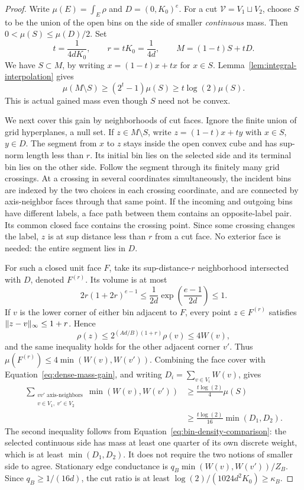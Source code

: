 \begin{proof}
Write $\mu(E)=\int_E\rho$ and $D=(0,K_0)^e$.  For a cut
$\mathcal V=V_1\sqcup V_2$, choose $S$ to be the union of the open bins
on the side of smaller \emph{continuous} mass.  Then
$0<\mu(S)\le\mu(D)/2$.  Set
\[
 t=\frac1{4dK_0},\qquad r=tK_0=\frac1{4d},\qquad
 M=(1-t)S+tD.
\]
We have $S\subset M$, by writing $x=(1-t)x+tx$ for $x\in S$.
Lemma~\ref{lem:integral-interpolation} gives
\begin{equation}\label{eq:dense-mass-gain}
 \mu(M\setminus S)\ge(2^t-1)\mu(S)
                    \ge t\log(2)\mu(S).
\end{equation}
This is actual gained mass even though $S$ need not be convex.

We next cover this gain by neighborhoods of cut faces.  Ignore the
finite union of grid hyperplanes, a null set.  If $z\in M\setminus S$,
write $z=(1-t)x+ty$ with $x\in S$, $y\in D$.  The segment from $x$ to
$z$ stays inside the open convex cube and has sup-norm length less than
$r$.  Its initial bin lies on the selected side and its terminal bin
lies on the other side.  Follow the segment through its finitely many
grid crossings.  At a crossing in several coordinates simultaneously,
the incident bins are indexed by the two choices in each crossing
coordinate, and are connected by axis-neighbor faces through that same
point.  If the incoming and outgoing bins have different labels, a face
path between them contains an opposite-label pair.  Its common closed
face contains the crossing point.  Since some crossing changes the
label, $z$ is at sup distance less than $r$ from a cut face.  No exterior
face is needed: the entire segment lies in $D$.

For such a closed unit face $F$, take its sup-distance-$r$ neighborhood
intersected with $D$, denoted $F^{(r)}$.  Its volume is at most
\[
 2r(1+2r)^{e-1}
 \le\frac1{2d}\exp\left(\frac{e-1}{2d}\right)\le1.
\]
If $v$ is the lower corner of either bin adjacent to $F$, every point
$z\in F^{(r)}$ satisfies $\lVert z-v\rVert_\infty\le1+r$.  Hence
\[
 \rho(z)\le2^{(Ad/B)(1+r)}\rho(v)\le4W(v),
\]
and the same inequality holds for the other adjacent corner $v'$.
Thus $\mu(F^{(r)})\le4\min(W(v),W(v'))$.  Combining the face cover with
Equation~\eqref{eq:dense-mass-gain}, and writing
$D_i=\sum_{v\in V_i}W(v)$, gives
\begin{align*}
 \sum_{\substack{vv'\text{ axis-neighbors}\\v\in V_1,\ v'\in V_2}}
             \min(W(v),W(v'))
 &\ge\frac{t\log(2)}4\mu(S)\\
 &\ge\frac{t\log(2)}{16}\min(D_1,D_2).
\end{align*}
The second inequality follows from
Equation~\eqref{eq:bin-density-comparison}: the selected continuous side
has mass at least one quarter of its own discrete weight, which is at
least $\min(D_1,D_2)$.  It does not require the two notions of smaller
side to agree.  Stationary edge conductance is
$q_B\min(W(v),W(v'))/Z_B$.  Since $q_B\ge1/(16d)$, the cut ratio is at
least $\log(2)/(1024d^2K_0)\ge\kappa_B$.


\end{proof}
